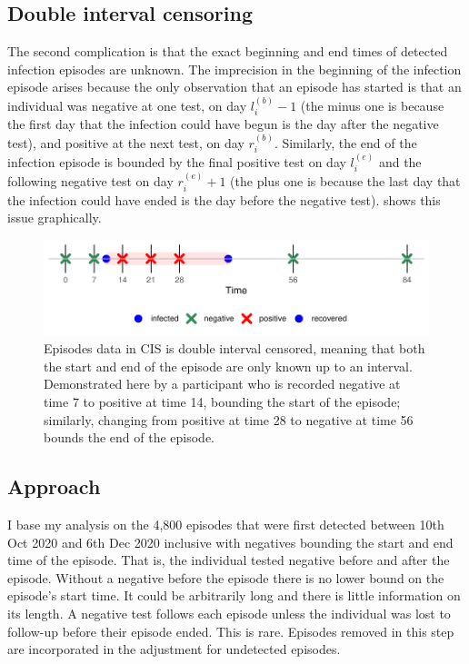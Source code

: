 \documentclass[thesis.tex]{subfiles}
\begin{document}
\subsection{Double interval censoring}

The second complication is that the exact beginning and end times of detected infection episodes are unknown.
The imprecision in the beginning of the infection episode arises because the only observation that an episode has started is that an individual was negative at one test, on day $l_i^{(b)}-1$ (the minus one is because the first day that the infection could have begun is the day after the negative test), and positive at the next test, on day $r_i^{(b)}$.
Similarly, the end of the infection episode is bounded by the final positive test on day $l_i^{(e)}$ and the following negative test on day $r_i^{(e)}+1$ (the plus one is because the last day that the infection could have ended is the day before the negative test).
 shows this issue graphically.
\begin{figure}
  \centering \includegraphics{cis-perfect-testing/double-interval-censor}
  \caption[Double-interval censoring in CIS data]{Episodes data in CIS is double interval censored, meaning that both the start and end of the episode are only known up to an interval. Demonstrated here by a participant who is recorded negative at time 7 to positive at time 14, bounding the start of the episode; similarly, changing from positive at time 28 to negative at time 56 bounds the end of the episode. \label{perf-test:fig:double-interval-censor}}
\end{figure}

\subsection{Approach} \label{perf-test:sec:approach}

I base my analysis on the 4,800 episodes that were first detected between 10th Oct 2020 and 6th Dec 2020 inclusive with negatives bounding the start and end time of the episode.
That is, the individual tested negative before and after the episode.
Without a negative before the episode there is no lower bound on the episode's start time.
It could be arbitrarily long and there is little information on its length.
A negative test follows each episode unless the individual was lost to follow-up before their episode ended.
This is rare.
Episodes removed in this step are incorporated in the adjustment for undetected episodes.
\end{document}
